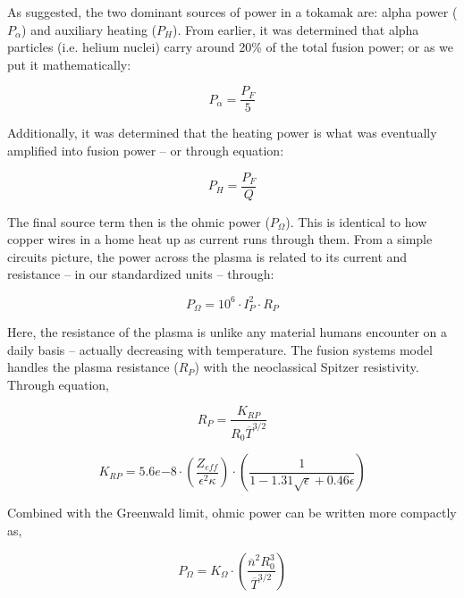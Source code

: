 As suggested, the two dominant sources of power in a tokamak are: alpha power ($P_\alpha$) and auxiliary heating ($P_H$). From earlier, it was determined that alpha particles (i.e. helium nuclei) carry around 20\% of the total fusion power; or as we put it mathematically:

\begin{equation}
	\label{eq:palpha}
	P_\alpha = \frac{P_F}{5}
\end{equation}

Additionally, it was determined that the heating power is what was eventually amplified into fusion power -- or through equation:

\begin{equation}
	\label{eq:ph}
	P_H = \frac{P_F}{Q}
\end{equation}

The final source term then is the ohmic power ($P_\Omega$). This is identical to how copper wires in a home heat up as current runs through them. From a simple circuits picture, the power across the plasma is related to its current and resistance -- in our standardized units -- through:

\begin{equation}
	\label{eq:pohmic_basic}
	P_\Omega = 10^6 \cdot I_P^2 \cdot R_P
\end{equation}

Here, the resistance of the plasma is unlike any material humans encounter on a daily basis -- actually decreasing with temperature. The fusion systems model handles the plasma resistance ($R_P$)  with the neoclassical Spitzer resistivity. Through equation,

\begin{equation}
	\label{eq:rp}
	R_P = \frac{K_{RP}}{R_0 \overline T ^ {3/2}}
\end{equation}

\begin{equation}
	K_{RP} = 5.6e{-8} \cdot \left( \frac{ Z_{eff} }{ \epsilon^2 \kappa } \right) \cdot \left( \frac{1}{ 1 - 1.31 \sqrt{ \epsilon } + 0.46 \epsilon } \right)
\end{equation}

Combined with the Greenwald limit, ohmic power can be written more compactly as,

\begin{equation}
	\label{eq:pohmic}
	P_\Omega = K_\Omega \cdot \left( \frac{ \overline n ^ 2 R_0^3 }{\overline T ^ {3/2}} \right)
\end{equation}

